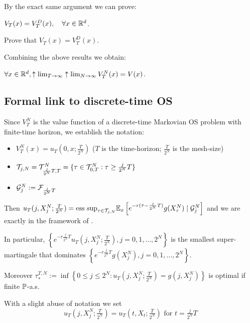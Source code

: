 By the exact same argument we can prove:
\begin{lemma}
    $V_T(x) = V_T^D(x), \quad \forall x \in \mathbb R^d$.
\end{lemma}

\begin{homework}
    Prove that $V_T(x) = V_T^D(x)$.
\end{homework}

Combining the above results we obtain:

\begin{corollary}
    $\forall x \in \mathbb R^d, \uparrow \lim_{T \to \infty} \uparrow \lim_{N \to \infty} V_T^N(x) = V(x)$.
\end{corollary}

\subsection*{Formal link to discrete-time OS}

Since $V_T^N$ is the value function of a discrete-time Markovian OS problem with finite-time horizon, we establish the notation:
\begin{itemize}
    \item $V_T^N(x) = u_T(0, x; \frac{T}{2^N})$ \quad ($T$ is the time-horizon; $\frac{T}{2^N}$ is the mesh-size)
    \item $\mathcal{T}_{j,N} = \mathcal{T}_{\frac{j}{2^N}T, T}^N = \{ \tau \in \mathcal{T}_{0,T}^N : \tau \geq \frac{j}{2^N} T \}$
    \item $\mathcal{G}_j^N := \mathcal{F}_{\frac{j}{2^N}T}$
\end{itemize}

Then $u_T(j, X_j^N; \frac{T}{2^N}) = \text{ess sup}_{\tau \in \mathcal{T}_{j,N}} \mathbb E_x \left[ e^{-r(\tau - \frac{j}{2^N}T)} g(X_\tau^N) \mid \mathcal{G}_j^N \right]$ and we are exactly in the framework of .

In particular, $\left\{ e^{-r \frac{j}{2^N}T} u_T(j, X_j^N; \frac{T}{2^N}), j = 0, 1, \dots, 2^N \right\}$ is the smallest super-martingale that dominates $\left\{ e^{-r \frac{j}{2^N}T} g(X_j^N), j = 0, 1, \dots, 2^N \right\}$.

Moreover $\tau_*^{T,N} := \inf \left\{ 0 \leq j \leq 2^N : u_T(j, X_j^N; \frac{T}{2^N}) = g(j, X_j^N) \right\}$ is optimal if finite $\mathbb P$-a.s.

\begin{remark*}
    With a slight abuse of notation we set
    \begin{equation*}
        \boxed{u_T(j, X_j^N; \tfrac{T}{2^N}) = u_T(t, X_t; \tfrac{T}{2^N}) \text{ for } t = \tfrac{j}{2^N} T}
    \end{equation*}
\end{remark*}

